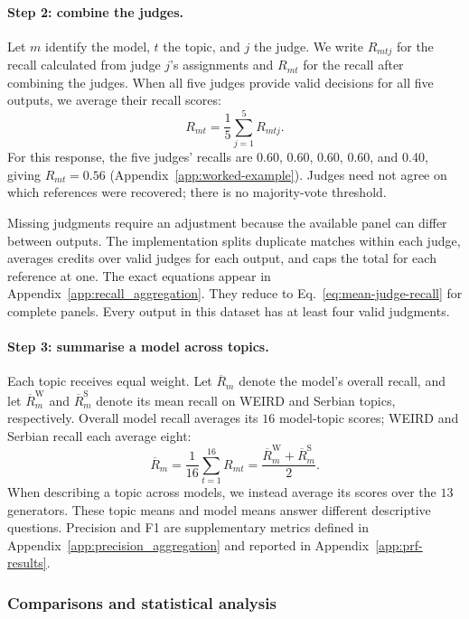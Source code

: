 \documentclass[11pt,a4paper]{article}
\begin{document}
\paragraph{Step 2: combine the judges.}
Let $m$ identify the model, $t$ the topic, and $j$ the judge. We write $R_{mtj}$ for the recall calculated from judge $j$'s assignments and $R_{mt}$ for the recall after combining the judges. When all five judges provide valid decisions for all five outputs, we average their recall scores:
\begin{equation}
R_{mt}=\frac{1}{5}\sum_{j=1}^{5}R_{mtj}.
\label{eq:mean-judge-recall}
\end{equation}
For this response, the five judges' recalls are 0.60, 0.60, 0.60, 0.60, and 0.40, giving $R_{mt}=0.56$ (Appendix~\ref{app:worked-example}). Judges need not agree on which references were recovered; there is no majority-vote threshold.

Missing judgments require an adjustment because the available panel can differ between outputs. The implementation splits duplicate matches within each judge, averages credits over valid judges for each output, and caps the total for each reference at one. The exact equations appear in Appendix~\ref{app:recall_aggregation}. They reduce to Eq.~\ref{eq:mean-judge-recall} for complete panels. Every output in this dataset has at least four valid judgments.

\paragraph{Step 3: summarise a model across topics.}
Each topic receives equal weight. Let $\overline R_m$ denote the model's overall recall, and let $\overline R_m^{\mathrm W}$ and $\overline R_m^{\mathrm S}$ denote its mean recall on WEIRD and Serbian topics, respectively. Overall model recall averages its $16$ model-topic scores; WEIRD and Serbian recall each average eight:
\begin{equation}
\overline R_m=\frac{1}{16}\sum_{t=1}^{16}R_{mt}
=\frac{\overline R_m^{\mathrm W}+\overline R_m^{\mathrm S}}{2}.
\label{eq:model-recall}
\end{equation}
When describing a topic across models, we instead average its scores over the $13$ generators. These topic means and model means answer different descriptive questions. Precision and F1 are supplementary metrics defined in Appendix~\ref{app:precision_aggregation} and reported in Appendix~\ref{app:prf-results}.

\subsubsection{Comparisons and statistical analysis}
\label{sec:statistics}
\end{document}
